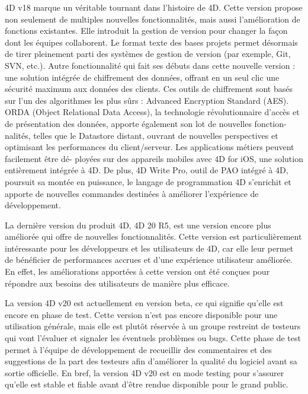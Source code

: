 4D v18 marque un véritable tournant dans l’histoire de 4D. Cette version propose non seulement de
multiples nouvelles fonctionnalités, mais aussi l’amélioration de fonctions existantes. Elle introduit la gestion de version pour changer 
la façon dont les équipes collaborent. Le format texte des bases projets permet désormais de tirer pleinement parti des systèmes de gestion de version
(par exemple, Git, SVN, etc.). Autre fonctionnalité qui fait ses débuts dans cette nouvelle version : une solution intégrée de chiffrement des données, 
offrant en un seul clic une sécurité maximum aux données des clients. Ces outils de chiffrement sont basés sur l’un des algorithmes les plus sûrs : 
Advanced Encryption Standard (AES). ORDA (Object Relational Data Access), la technologie révolutionnaire d’accès et de présentation 
des données, apporte également son lot de nouvelles fonction- nalités, telles que le Datastore distant, ouvrant de nouvelles perspectives et optimisant les 
performances du client/serveur. Les applications métiers peuvent facilement être dé- ployées sur des appareils mobiles avec 4D for iOS, une solution 
entièrement intégrée à 4D. De plus, 4D Write Pro, outil de PAO intégré à 4D, poursuit sa montée en puissance, le langage de programmation 4D s’enrichit et apporte de nouvelles commandes destinées à améliorer l’expérience de développement.
\newline

La dernière version du produit 4D, 4D 20 R5, est une version encore plus améliorée qui offre de nouvelles 
fonctionnalités. Cette version est particulièrement intéressante pour les développeurs et les utilisateurs de 4D,
car elle leur permet de bénéficier de performances accrues et d’une expérience utilisateur améliorée.
En effet, les améliorations apportées à cette version ont été conçues pour répondre aux besoins des utilisateurs de manière plus eﬀicace.
\newline

La version 4D v20 est actuellement en version beta, ce qui signifie 
qu’elle est encore en phase de test. Cette version n’est pas encore 
disponible pour une utilisation générale, mais elle est plutôt réservée 
à un groupe restreint de testeurs qui vont l’évaluer et signaler 
les éventuels problèmes ou bugs. Cette phase de test permet à l’équipe 
de développement de recueillir des commentaires et des suggestions de la part 
des testeurs afin d’améliorer la qualité du logiciel avant sa sortie oﬀicielle. 
En bref, la version 4D v20 est en mode testing pour s’assurer qu’elle est stable et 
fiable avant d’être rendue disponible pour le grand public.

